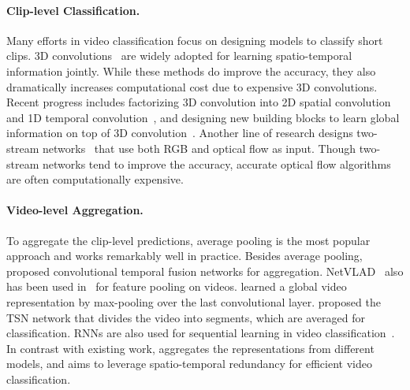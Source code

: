 \documentclass[10pt,twocolumn,letterpaper]{article}
\begin{document}
\paragraph{Clip-level Classification.}
Many efforts in video classification focus on designing models to classify short clips. 3D convolutions~\cite{baccouche2011sequential,ji20133d,karpathy2014large,c3d} are widely adopted for learning spatio-temporal information jointly. 
While these methods do improve the accuracy, they also dramatically increases computational cost due to expensive 3D convolutions.
Recent progress includes factorizing 3D convolution into 2D spatial convolution and 1D temporal convolution~\cite{sun2015human,qiu2017learning,tran2018closer,Xie_2018_ECCV,zhou2018mict}, and designing new building blocks to learn global information on top of 3D convolution~\cite{wang2018non,chen2018multi}. Another line of research designs two-stream networks~\cite{simonyan2014two,yue2015beyond,wang2016temporal,feichtenhofer2016convolutional,carreira2017quo,Xie_2018_ECCV} that use both RGB and optical flow as input. Though two-stream networks tend to improve the accuracy, accurate optical flow algorithms are often computationally expensive.


\paragraph{Video-level Aggregation.}
To aggregate the clip-level predictions, average pooling is the most popular approach and works remarkably well in practice.
Besides average pooling, \cite{karpathy2014large} proposed convolutional temporal fusion networks for aggregation.
NetVLAD~\cite{arandjelovic2016netvlad} also has been used in~\cite{girdhar2017actionvlad} for feature pooling on videos.
\cite{yue2015beyond} learned a global video representation by max-pooling over the last convolutional layer.
\cite{wang2016temporal} proposed the TSN network that divides the video into segments, which are averaged for classification.
RNNs are also used for sequential learning in video classification~\cite{icml2015_srivastava,yue2015beyond,li2018videolstm}.
In contrast with existing work,  \ours  aggregates the representations from different models, and aims to leverage spatio-temporal redundancy for efficient video classification.
\end{document}
